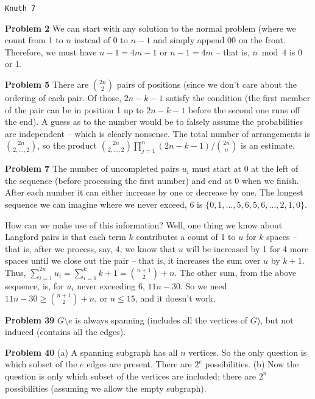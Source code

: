 \def\newstep#1{\smallskip \noindent {\bf #1}}
\def\newprob#1{\vskip 0.12in \noindent {\bf #1}}

\topglue 0.5in
\centerline{\tt Knuth 7}
\vskip 0.3in

\noindent
{\bf Problem 2} We can start with any solution to the normal problem (where we count
from 1 to $n$ instead of 0 to $n-1$ and simply
append 00 on the front.  Therefore, we must have $n-1 = 4m - 1$ or $n-1 = 4m$ --
that is, $n \bmod 4$ is 0 or 1.

\vskip 0.1in
\noindent
{\bf Problem 5} There are $2 n \choose 2$ pairs of positions (since we don't care about 
the ordering of each pair.  Of those, $2 n - k - 1$ satisfy the condition (the first member of the 
pair can be in position 1 up to $2 n - k - 1$ before the second one runs off the end).
A guess as to the number would be to falsely assume the probabilities are independent --
which is clearly nonsense.  The total number of arrangements is $2 n \choose 2, \ldots, 2$,
so the product  ${2 n \choose 2, \ldots, 2} \prod_{j=1}^n \left(2 n - k - 1\right) / {2 n \choose n}$
is an estimate.

\vskip 0.1in
\noindent
{\bf Problem 7} The number of uncompleted pairs $u_i$ must start at 0 at the left of
the sequence (before processing the first number) and end at 0 when we finish.
After each number it can either increase by one or decrease by one.  The longest
sequence we can imagine where we never exceed, 6 is
$\{0, 1, \ldots, 5, 6, 5, 6, \ldots, 2, 1, 0\}$.

How can we make use of this information?  Well, one thing we know about Langford
pairs is that each term $k$ contributes a count of 1 to $u$ for $k$ spaces -- that
is, after we process, say, 4, we know that $u$ will be increased by 1 for 4 more spaces
until we close out the pair -- that is, it increases the sum over $u$ by $k+1$.
Thus, $\sum_{i=1}^{2 n} u_i = \sum_{i=1}^{k} k + 1 = {n+1 \choose 2} + n$.  The
other sum, from the above sequence, is, for $u_i$ never exceeding 6,
$11 n - 30$.  So we need $11  n - 30 \ge {n + 1 \choose 2} + n$, or $n \le 15$,
and it doesn't work.

\vskip 0.1in
\noindent
{\bf Problem 39} $G \setminus e$ is always spanning (includes all the vertices of $G$),
but not induced (contains all the edges).

\vskip 0.1in
\noindent
{\bf Problem 40} (a) A spanning subgraph has all $n$ vertices.  So the only
question is which subset of the $e$ edges are present.  There are $2^e$ 
possibilities. (b) Now the question is only which subset of the vertices
are included; there are $2^n$ possibilities (assuming we allow the empty
subgraph).


